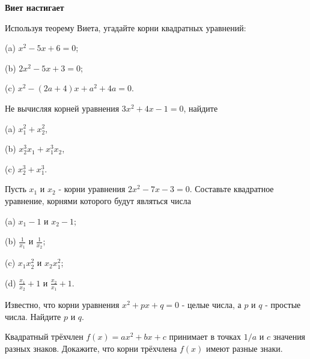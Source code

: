 \centerline{\bf \Huge Виет настигает}

\begin{flushright}
        \scriptsize{}
\end{flushright}

Используя теорему Виета, угадайте корни квадратных уравнений:

(a) $x^2-5 x+6=0$;

(b) $2 x^2-5 x+3=0$;

(c) $x^2-(2 a+4) x+a^2+4 a=0$.

Не вычисляя корней уравнения $3 x^2+4 x-1=0$, найдите

(a) $x_1^2+x_2^2$,

(b) $x_2^3 x_1+x_1^3 x_2$,

(c) $x_2^3+x_1^3$.

Пусть $x_1$ и $x_2$ - корни уравнения $2 x^2-7 x-3=0$. Составьте квадратное уравнение, корнями которого будут являться числа

(a) $x_1-1$ и $x_2-1$;

(b) $\frac{1}{x_1}$ и $\frac{1}{x_2}$;

(c) $x_1 x_2^2$ и $x_2 x_1^2$;

(d) $\frac{x_1}{x_2}+1$ и $\frac{x_2}{x_1}+1$.

Известно, что корни уравнения $x^2+p x+q=0$ - целые числа, а $p$ и $q$ - простые числа. Найдите $p$ и $q$.

Квадратный трёхчлен $f(x)=a x^2+b x+c$ принимает в точках $1 / a$ и $c$ значения разных знаков. Докажите, что корни трёхчлена $f(x)$ имеют разные знаки.
